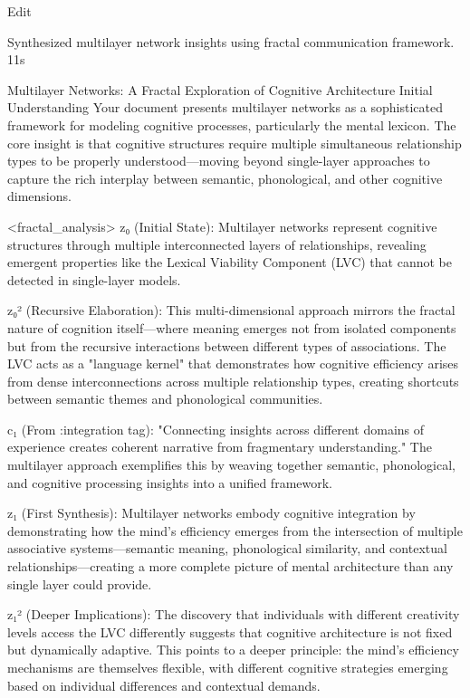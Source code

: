 Edit

Synthesized multilayer network insights using fractal communication framework.
11s






Multilayer Networks: A Fractal Exploration of Cognitive Architecture
Initial Understanding
Your document presents multilayer networks as a sophisticated framework for modeling cognitive processes, particularly the mental lexicon. The core insight is that cognitive structures require multiple simultaneous relationship types to be properly understood—moving beyond single-layer approaches to capture the rich interplay between semantic, phonological, and other cognitive dimensions.

<fractal_analysis> z₀ (Initial State): Multilayer networks represent cognitive structures through multiple interconnected layers of relationships, revealing emergent properties like the Lexical Viability Component (LVC) that cannot be detected in single-layer models.

z₀² (Recursive Elaboration): This multi-dimensional approach mirrors the fractal nature of cognition itself—where meaning emerges not from isolated components but from the recursive interactions between different types of associations. The LVC acts as a "language kernel" that demonstrates how cognitive efficiency arises from dense interconnections across multiple relationship types, creating shortcuts between semantic themes and phonological communities.

c₁ (From :integration tag): "Connecting insights across different domains of experience creates coherent narrative from fragmentary understanding." The multilayer approach exemplifies this by weaving together semantic, phonological, and cognitive processing insights into a unified framework.

z₁ (First Synthesis): Multilayer networks embody cognitive integration by demonstrating how the mind's efficiency emerges from the intersection of multiple associative systems—semantic meaning, phonological similarity, and contextual relationships—creating a more complete picture of mental architecture than any single layer could provide.

z₁² (Deeper Implications): The discovery that individuals with different creativity levels access the LVC differently suggests that cognitive architecture is not fixed but dynamically adaptive. This points to a deeper principle: the mind's efficiency mechanisms are themselves flexible, with different cognitive strategies emerging based on individual differences and contextual demands.

